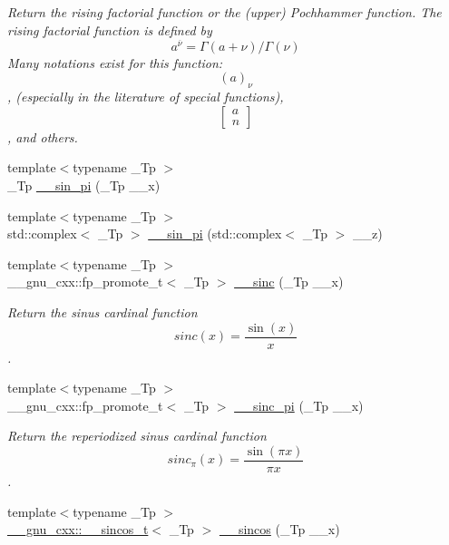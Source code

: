 \begin{DoxyCompactItemize}
\begin{DoxyCompactList}\small\item\em Return the rising factorial function or the (upper) Pochhammer function. The rising factorial function is defined by \[ a^{\overline{\nu}} = \Gamma(a + \nu) / \Gamma(\nu) \] Many notations exist for this function\+: \[ (a)_\nu \], (especially in the literature of special functions), \[ \left[ \begin{array}{c} a \\ n \end{array} \right] \], and others. \end{DoxyCompactList}\item 
{\footnotesize template$<$typename \+\_\+\+Tp $>$ }\\\+\_\+\+Tp \hyperlink{namespacestd_1_1____detail_a763249defff6377195818c2fc6e7bca2}{\+\_\+\+\_\+sin\+\_\+pi} (\+\_\+\+Tp \+\_\+\+\_\+x)
\item 
{\footnotesize template$<$typename \+\_\+\+Tp $>$ }\\std\+::complex$<$ \+\_\+\+Tp $>$ \hyperlink{namespacestd_1_1____detail_a5f26e85b3d646e5c69be173baebd4185}{\+\_\+\+\_\+sin\+\_\+pi} (std\+::complex$<$ \+\_\+\+Tp $>$ \+\_\+\+\_\+z)
\item 
{\footnotesize template$<$typename \+\_\+\+Tp $>$ }\\\+\_\+\+\_\+gnu\+\_\+cxx\+::fp\+\_\+promote\+\_\+t$<$ \+\_\+\+Tp $>$ \hyperlink{namespacestd_1_1____detail_ad0730b2b26df36cc8876a1152d895523}{\+\_\+\+\_\+sinc} (\+\_\+\+Tp \+\_\+\+\_\+x)
\begin{DoxyCompactList}\small\item\em Return the sinus cardinal function \[ sinc(x) = \frac{\sin(x)}{x} \]. \end{DoxyCompactList}\item 
{\footnotesize template$<$typename \+\_\+\+Tp $>$ }\\\+\_\+\+\_\+gnu\+\_\+cxx\+::fp\+\_\+promote\+\_\+t$<$ \+\_\+\+Tp $>$ \hyperlink{namespacestd_1_1____detail_ae73746d4ab5c5087c5d302e428490396}{\+\_\+\+\_\+sinc\+\_\+pi} (\+\_\+\+Tp \+\_\+\+\_\+x)
\begin{DoxyCompactList}\small\item\em Return the reperiodized sinus cardinal function \[ sinc_\pi(x) = \frac{\sin(\pi x)}{\pi x} \]. \end{DoxyCompactList}\item 
{\footnotesize template$<$typename \+\_\+\+Tp $>$ }\\\hyperlink{struct____gnu__cxx_1_1____sincos__t}{\+\_\+\+\_\+gnu\+\_\+cxx\+::\+\_\+\+\_\+sincos\+\_\+t}$<$ \+\_\+\+Tp $>$ \hyperlink{namespacestd_1_1____detail_a59a9ff6922faa1a88da8b485ee9d37cb}{\+\_\+\+\_\+sincos} (\+\_\+\+Tp \+\_\+\+\_\+x)

\end{DoxyCompactItemize}
